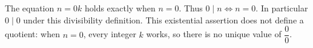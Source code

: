 The equation $n=0k$ holds exactly when $n=0$. Thus $\boxed{0\mid n\iff n=0}$. In particular $0\mid0$ under this divisibility definition. This existential assertion does not define a quotient: when $n=0$, every integer $k$ works, so there is no unique value of $\dfrac{0}{0}$.
